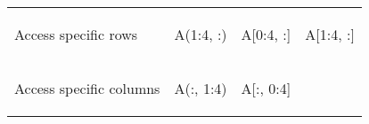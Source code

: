 \documentclass[10pt, landscape]{article}
\newenvironment{Shaded}{}{}
\newcommand{\DecValTok}[1]{\textcolor[rgb]{0.25,0.63,0.44}{{#1}}}
\newcommand{\FloatTok}[1]{\textcolor[rgb]{0.25,0.63,0.44}{{#1}}}
\newcommand{\NormalTok}[1]{{#1}}
\begin{document}
\begin{multicols}{2}
\begin{tabular}[ ]{@{}llll@{}}
\begin{minipage}[t]{0.23\columnwidth}\raggedright\strut
Access specific rows\strut
\end{minipage} & \begin{minipage}[t]{0.23\columnwidth}\raggedright\strut
\begin{Shaded}
\begin{Highlighting}[]
\NormalTok{A(}\FloatTok{1}\NormalTok{:}\FloatTok{4}\NormalTok{, :)}
\end{Highlighting}
\end{Shaded}
\strut
\end{minipage} & \begin{minipage}[t]{0.23\columnwidth}\raggedright\strut
\begin{Shaded}
\begin{Highlighting}[]
\NormalTok{A[}\DecValTok{0}\NormalTok{:}\DecValTok{4}\NormalTok{, :]}
\end{Highlighting}
\end{Shaded}
\strut
\end{minipage} & \begin{minipage}[t]{0.20\columnwidth}\raggedright\strut
\begin{Shaded}
\begin{Highlighting}[]
\NormalTok{A[}\FloatTok{1}\NormalTok{:}\FloatTok{4}\NormalTok{, :]}
\end{Highlighting}
\end{Shaded}
\strut
\end{minipage}\tabularnewline
\begin{minipage}[t]{0.23\columnwidth}\raggedright\strut
Access specific columns\strut
\end{minipage} & \begin{minipage}[t]{0.23\columnwidth}\raggedright\strut
\begin{Shaded}
\begin{Highlighting}[]
\NormalTok{A(:, }\FloatTok{1}\NormalTok{:}\FloatTok{4}\NormalTok{)}
\end{Highlighting}
\end{Shaded}
\strut
\end{minipage} & \begin{minipage}[t]{0.23\columnwidth}\raggedright\strut
\begin{Shaded}
\begin{Highlighting}[]
\NormalTok{A[:, }\DecValTok{0}\NormalTok{:}\DecValTok{4}\NormalTok{]}
\end{Highlighting}
\end{Shaded}

\end{minipage}
\end{tabular}
\end{multicols}
\end{document}

